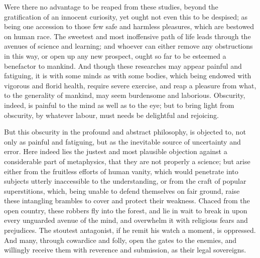 \documentclass[]{article}
\begin{document}
\begin{sectionbody}
\humeparagraph  Were there no advantage to be reaped from these studies, beyond the gratification of an innocent curiosity, yet ought not even this to be despised; as being one accession to those few safe and harmless pleasures, which are bestowed on human race. The sweetest and most inoffensive path of life leads through the avenues of science and learning; and whoever can either remove any obstructions in this way, or open up any new prospect, ought so far to be esteemed a benefactor to mankind. And though these researches may appear painful and fatiguing, it is with some minds as with some bodies, which being endowed with vigorous and florid health, require severe exercise, and reap a pleasure from what, to the generality of mankind, may seem burdensome and laborious. Obscurity, indeed, is painful to the mind as well as to the eye; but to bring light from obscurity, by whatever labour, must needs be delightful and rejoicing.

\humeparagraph  But this obscurity in the profound and abstract philosophy, is objected to, not only as painful and fatiguing, but as the inevitable source of uncertainty and error. Here indeed lies the justest and most plausible objection against a considerable part of metaphysics, that they are not properly a science; but arise either from the fruitless efforts of human vanity, which would penetrate into subjects utterly inaccessible to the understanding, or from the craft of popular superstitions, which, being unable to defend themselves on fair ground, raise these intangling brambles to cover and protect their weakness. Chaced from the open country, these robbers fly into the forest, and lie in wait to break in upon every unguarded avenue of the mind, and overwhelm it with religious fears and prejudices. The stoutest antagonist, if he remit his watch a moment, is oppressed. And many, through cowardice and folly, open the gates to the enemies, and willingly receive them with reverence and submission, as their legal sovereigns.


\end{sectionbody}
\end{document}
